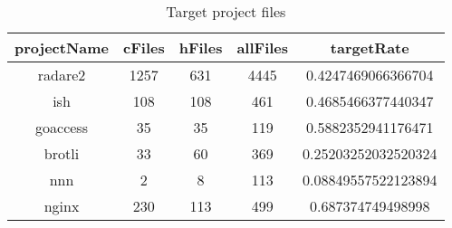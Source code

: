 
\begin{table}[h]
	\caption{Target project files}
	\label{table:target_projects_files_table}
		\begin{tabular}{ccccc}
		\hline
		projectName & cFiles & hFiles & allFiles & targetRate \\ 
		\hline \hline
		radare2 & 1257 & 631 & 4445 & 0.4247469066366704 \\ 
		\hline
		ish & 108 & 108 & 461 & 0.4685466377440347 \\ 
		\hline
		goaccess & 35 & 35 & 119 & 0.5882352941176471 \\ 
		\hline
		brotli & 33 & 60 & 369 & 0.25203252032520324 \\ 
		\hline
		nnn & 2 & 8 & 113 & 0.08849557522123894 \\ 
		\hline
		nginx & 230 & 113 & 499 & 0.687374749498998 \\ 
		\hline
	\end{tabular}
\end{table}